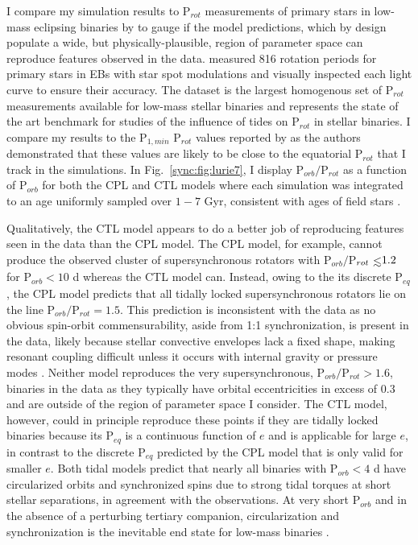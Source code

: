 I compare my simulation results to P$_{rot}$ measurements of primary stars in \kepler low-mass eclipsing binaries by \citet{Lurie2017} to gauge if the model predictions, which by design populate a wide, but physically-plausible, region of parameter space can reproduce features observed in the data.  \citet{Lurie2017} measured 816 rotation periods for primary stars in \kepler EBs with star spot modulations and visually inspected each light curve to ensure their accuracy. The \citet{Lurie2017} dataset is the largest homogenous set of P$_{rot}$ measurements available for low-mass stellar binaries and represents the state of the art benchmark for studies of the influence of tides on P$_{rot}$ in stellar binaries. I compare my results to the P$_{1,min}$ P$_{rot}$ values reported by \citet{Lurie2017} as the authors demonstrated that these values are likely to be close to the equatorial P$_{rot}$ that I track in the simulations. In Fig.~\ref{sync:fig:lurie7}, I display P$_{orb}/$P$_{rot}$ as a function of P$_{orb}$ for both the CPL and CTL models where each simulation was integrated to an age uniformly sampled over $1-7$ Gyr, consistent with ages of \kepler field stars \citep{Chaplin2014}. 

Qualitatively, the CTL model appears to do a better job of reproducing features seen in the \citet{Lurie2017} data than the CPL model. The CPL model, for example, cannot produce the observed cluster of supersynchronous rotators with P$_{orb}/$P$_{rot} \lsim 1.2$ for P$_{orb} < 10$ d whereas the CTL model can. Instead, owing to the its discrete P$_{eq}$, the CPL model predicts that all tidally locked supersynchronous rotators lie on the line P$_{orb}/$P$_{rot} = 1.5$. This prediction is inconsistent with the data as no obvious spin-orbit commensurability, aside from 1:1 synchronization, is present in the \citet{Lurie2017} data, likely because stellar convective envelopes lack a fixed shape, making resonant coupling difficult unless it occurs with internal gravity or pressure modes \citep{Burkart2014,Lurie2017}. Neither model reproduces the very supersynchronous, P$_{orb}/$P$_{rot} > 1.6$, binaries in the \citet{Lurie2017} data as they typically have orbital eccentricities in excess of 0.3 and are outside of the region of parameter space I consider. The CTL model, however, could in principle reproduce these points if they are tidally locked binaries because its P$_{eq}$ is a continuous function of $e$ and is applicable for large $e$, in contrast to the discrete P$_{eq}$ predicted by the CPL model that is only valid for smaller $e$. Both tidal models predict that nearly all binaries with P$_{orb} < 4$ d have circularized orbits and synchronized spins due to strong tidal torques at short stellar separations, in agreement with the \citet{Lurie2017} observations. At very short P$_{orb}$ and in the absence of a perturbing tertiary companion, circularization and synchronization is the inevitable end state for low-mass binaries \citep{Counselman1973}. 

